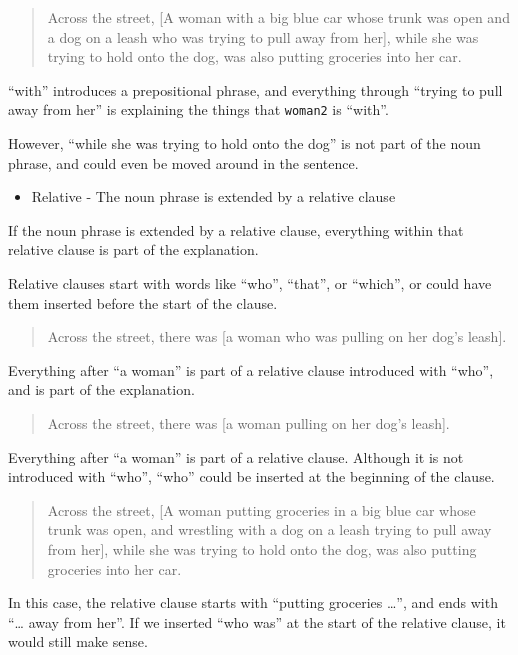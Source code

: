 \documentclass[
]{book}
\providecommand{\tightlist}{%
  \setlength{\itemsep}{0pt}\setlength{\parskip}{0pt}}
\begin{document}
\begin{quote}
Across the street,
{[}A woman with a big blue car whose trunk was open
and a dog on a leash who was trying to pull away from her{]},
while she was trying to hold onto the dog,
was also putting groceries into her car.
\end{quote}

``with'' introduces a prepositional phrase,
and everything through ``trying to pull away from her''
is explaining the things that \texttt{woman2} is ``with''.

However, ``while she was trying to hold onto the dog''
is not part of the noun phrase,
and could even be moved around in the sentence.

\begin{itemize}
\tightlist
\item
  Relative - The noun phrase is extended by a relative clause
\end{itemize}

If the noun phrase is extended by a relative clause,
everything within that relative clause is part of the explanation.

Relative clauses start with words like ``who'', ``that'', or ``which'',
or could have them inserted before the start of the clause.

\begin{quote}
Across the street,
there was {[}a woman who was pulling on her dog's leash{]}.
\end{quote}

Everything after ``a woman''
is part of a relative clause introduced with ``who'',
and is part of the explanation.

\begin{quote}
Across the street,
there was {[}a woman pulling on her dog's leash{]}.
\end{quote}

Everything after ``a woman'' is part of a relative clause.
Although it is not introduced with ``who'',
``who'' could be inserted at the beginning of the clause.

\begin{quote}
Across the street,
{[}A woman putting groceries in a big blue car whose trunk was open,
and wrestling with a dog on a leash trying to pull away from her{]},
while she was trying to hold onto the dog,
was also putting groceries into her car.
\end{quote}

In this case, the relative clause starts with ``putting groceries \ldots{}'',
and ends with ``\ldots{} away from her''.
If we inserted ``who was'' at the start of the relative clause,
it would still make sense.
\end{document}
